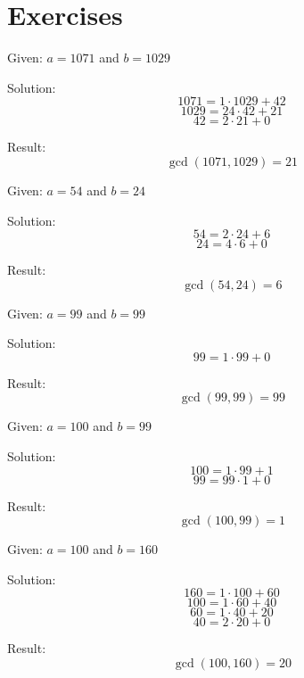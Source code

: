 \documentclass[a4paper, 10pt]{scrartcl}
\begin{document}
\section{Exercises}

Given: $a = 1071$ and $b = 1029$

Solution:
\[
1071 = 1\cdot 1029 + 42
\]
\[
1029 = 24\cdot 42 + 21
\]
\[
42 = 2\cdot 21 + 0
\]

Result:
\[
\gcd(1071, 1029) = 21
\]

Given: $a = 54$ and $b = 24$

Solution:
\[
54 = 2\cdot 24 + 6
\]
\[
24 = 4\cdot 6 + 0
\]

Result:
\[
\gcd(54, 24) = 6
\]

Given: $a = 99$ and $b = 99$

Solution:
\[
99 = 1\cdot 99 + 0
\]

Result:
\[
\gcd(99, 99) = 99
\]

Given: $a = 100$ and $b = 99$

Solution:
\[
100 = 1\cdot 99 + 1
\]
\[
99 = 99\cdot 1 + 0
\]

Result:
\[
\gcd(100, 99) = 1
\]

Given: $a = 100$ and $b = 160$

Solution:
\[
160 = 1\cdot 100 + 60
\]
\[
100 = 1\cdot 60 + 40
\]
\[
60 = 1\cdot 40 + 20
\]
\[
40 = 2\cdot 20 + 0
\]

Result:
\[
\gcd(100, 160) = 20
\]
\end{document}
